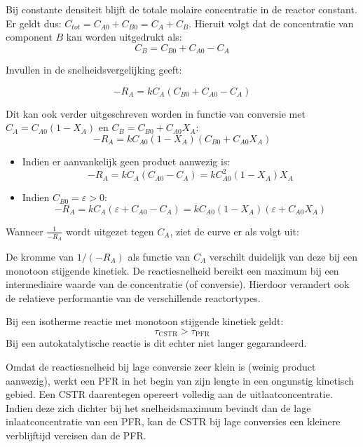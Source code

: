 \documentclass{ximera}
\begin{document}
Bij constante densiteit blijft de totale molaire concentratie in de reactor constant. Er geldt dus: $C_{tot} = C_{A0} + C_{B0} = C_A + C_B$.
Hieruit volgt dat de concentratie van component $B$ kan worden uitgedrukt als:
\[
C_B = C_{B0} + C_{A0} - C_A
\]

Invullen in de snelheidsvergelijking geeft:

\[
-R_A = k C_A (C_{B0} + C_{A0} - C_A)
\]


Dit kan ook verder uitgeschreven worden in functie van conversie met $C_A = C_{A0}(1-X_A)$ en $C_B = C_{B0}+C_{A0}X_A$:
\[
-R_A
= k C_{A0}(1-X_A)(C_{B0} + C_{A0}X_A)
\]

 \begin{itemize}
     \item Indien er aanvankelijk geen product aanwezig is:
     \[-R_A = k C_A (C_{A0}-C_A) = k C_{A0}^2(1-X_A)X_A\]
     \item Indien $C_{B0}=\varepsilon >0$:
     \[-R_A = k C_A (\varepsilon + C_{A0}-C_A)= k C_{A0}(1-X_A)(\varepsilon + C_{A0}X_A) \]
 \end{itemize}

Wanneer $\frac{1}{-R_A}$ wordt uitgezet tegen $C_A$, ziet de curve er als volgt uit:

\begin{image}
\end{image} 

De kromme van $1/(-R_A)$ als functie van $C_A$ verschilt duidelijk van deze bij een monotoon stijgende kinetiek. De reactiesnelheid bereikt een maximum bij een intermediaire waarde van de concentratie (of conversie). 
Hierdoor verandert ook de relatieve performantie van de verschillende reactortypes.

Bij een isotherme reactie met monotoon stijgende kinetiek geldt:
\[
\tau_{\text{CSTR}}>\tau_{\text{PFR}}
\]
Bij een autokatalytische reactie is dit echter niet langer gegarandeerd.

Omdat de reactiesnelheid bij lage conversie zeer klein is (weinig product aanwezig), werkt een PFR in het begin van zijn lengte in een
ongunstig kinetisch gebied. Een CSTR daarentegen opereert volledig aan de uitlaatconcentratie. Indien deze zich dichter bij het snelheidsmaximum bevindt dan de lage inlaatconcentratie van een PFR, kan de CSTR bij lage conversies een kleinere verblijftijd vereisen dan de PFR.\\
\end{document}
